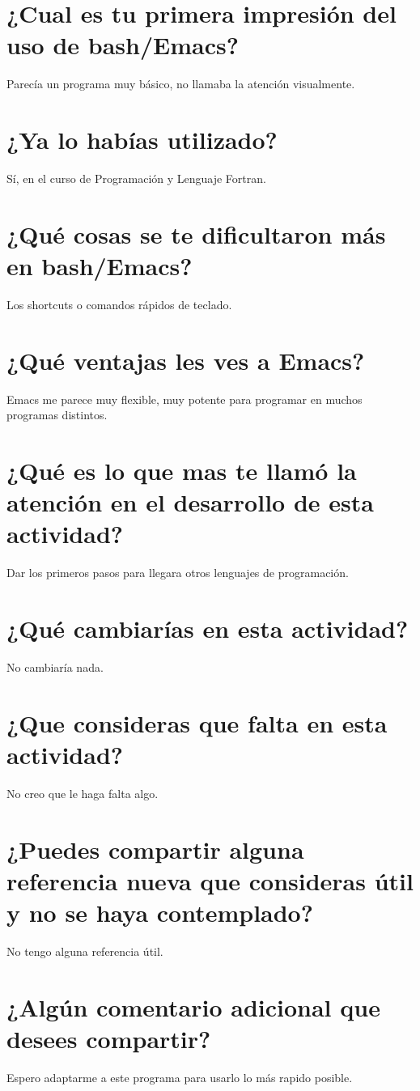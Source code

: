 \documentclass{article}
\begin{document}
\section{¿Cual es tu primera impresión del uso de bash/Emacs?}
Parecía un programa muy básico, no llamaba la atención visualmente.

\section{¿Ya lo habías utilizado?}
Sí, en el curso de Programación y Lenguaje Fortran.

\section{¿Qué cosas se te dificultaron más en bash/Emacs?}
Los shortcuts o comandos rápidos de teclado.

\section{¿Qué ventajas les ves a Emacs?}
Emacs me parece muy flexible, muy potente para programar en muchos programas distintos.

\section{¿Qué es lo que mas te llamó la atención en el desarrollo de esta actividad?}
Dar los primeros pasos para llegara otros lenguajes de programación.

\section{¿Qué cambiarías en esta actividad?}
No cambiaría nada.

\section{¿Que consideras que falta en esta actividad?}
No creo que le haga falta algo.

\section{¿Puedes compartir alguna referencia nueva que consideras útil y no se haya contemplado?}
No tengo alguna referencia útil.

\section{¿Algún comentario adicional que desees compartir?}
Espero adaptarme a este programa para usarlo lo más rapido posible.
\end{document}
